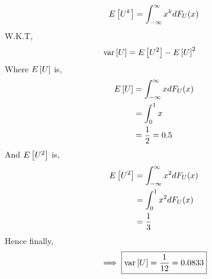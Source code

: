 \documentclass[journal,12pt,twocolumn]{IEEEtran}
\begin{document}
%
\begin{equation}
E{}\left[U^k\right] = \int_{-\infty}^{\infty}x^kdF_{U}(x)
\end{equation}
\solution 
W.K.T,
\begin{align}
    \text{var}{}\left[U\right] &= E{}\left[U^2\right]- E{}\left[U\right]^2
\end{align}
Where $E{}\left[U\right]$ is,
\begin{align}
   E{}\left[U\right]&=\int_{-\infty}^{\infty}xdF_U(x)\\
             &=\int_{0}^{1}x\\
             &=\frac{1}{2} = 0.5
\end{align}
And $E{}\left[U^2\right]$ is,
\begin{align}
    E{}\left[U^2\right]&=\int_{-\infty}^{\infty}x^{2}dF_U(x)\\
                &=\int_{0}^{1}x^{2}dF_U(x)\\
                &=\frac{1}{3}\\
\end{align}
Hence finally,
\begin{align}
    \implies \boxed{\text{var}{}\left[U\right]=\frac{1}{12}=0.0833}
\end{align}

\end{document}
